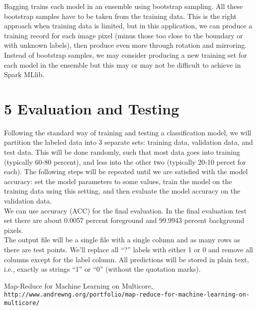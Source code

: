 \documentclass{neu_handout}
\begin{document}
Bagging trains each model in an ensemble using bootstrap sampling. All these bootstrap
samples have to be taken from the training data. This is the right approach when training data is limited, but in this application, we can produce a training record for each image pixel (minus those too close to the
boundary or with unknown labels), then produce even more through rotation and mirroring. Instead of bootstrap samples, we may consider producing a new training set for each model in the ensemble but this may or may not be difficult to achieve in Spark MLlib.

\section*{5 Evaluation and Testing}
Following the standard way of training and testing a classification model, we will partition the labeled data into 3 separate sets: training data, validation data, and test data. This will be done randomly, such that most data goes into training (typically 60-80 percent), and less into the
other two (typically 20-10 percet for each). The following steps will be repeated until we are satisfied with the model accuracy: set the model parameters to some values, train the model on the training data using this setting, and then evaluate the model accuracy on the validation data.\\

We can use accuracy (ACC) for the final evaluation. In the final evaluation test set there are about 0.0057 percent foreground and 99.9943 percent background pixels.\\

The output file will be a single file with a single column and as many rows as there are test points. We'll replace all “?” labels with either 1 or 0 and remove all columns except for the label column. All predictions will be stored in plain text, i.e., exactly as strings “1” or “0” (without the quotation marks).


\begin{thebibliography}{9}
Map-Reduce for Machine Learning on Multicore,
\\\texttt{http://www.andrewng.org/portfolio/map-reduce-for-machine-learning-on-multicore/}
\end{thebibliography}
\end{document}
